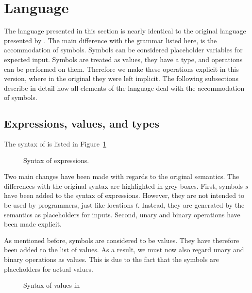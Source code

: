 

\section{Language}
\label{sec:language}

The language presented in this section is nearly identical to the original \TOPHAT language presented by \citet{Steenvoorden2019}.
The main difference with the grammar listed here, is the accommodation of symbols.
Symbols can be considered placeholder variables for expected input.
Symbols are treated as values, they have a type, and operations can be performed on them.
Therefore we make these operations explicit in this version,
where in the original they were left implicit.
The following subsections describe in detail how all elements of the \TOPHAT language deal with the accommodation of symbols.


\subsection{Expressions, values, and types}
\label{expressions}

The syntax of \TOPHAT is listed in Figure~\ref{fig:syntaxtophat}

\begin{figure}
  \small
  \caption{Syntax of \TOPHAT expressions.}
  \label{fig:syntaxtophat}
\end{figure}

Two main changes have been made with regards to the original \TOPHAT semantics.
The differences with the original syntax are highlighted in grey boxes.
First, symbols $s$ have been added to the syntax of expressions.
However, they are not intended to be used by programmers, just like locations $l$.
Instead, they are generated by the semantics as placeholders for inputs.
Second, unary and binary operations have been made explicit.

As mentioned before, symbols are considered to be values.
They have therefore been added to the list of values.
As a result, we must now also regard unary and binary operations as values.
This is due to the fact that the symbols are placeholders for actual values.

\begin{figure}
  \small
  \caption{Syntax of values in \TOPHAT}
  \label{fig:syntaxvalues}
\end{figure}

